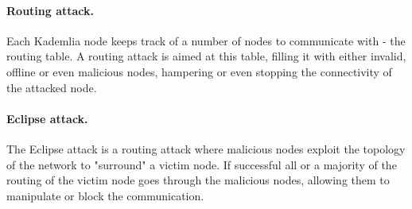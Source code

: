 \documentclass[12pt]{article}
\begin{document}
\paragraph{Routing attack.} Each Kademlia node keeps track of a number of nodes
to communicate with - the routing table. A routing attack is aimed at this
table, filling it with either invalid, offline or even malicious nodes,
hampering or even stopping the connectivity of the attacked node.

\paragraph{Eclipse attack.} The Eclipse attack \cite{singh2006eclipse} is a
routing attack where malicious nodes exploit the topology of the network to
"surround" a victim node. If successful all or a majority of the routing of the
victim node goes through the malicious nodes, allowing them to manipulate or
block the communication.




\end{document}
